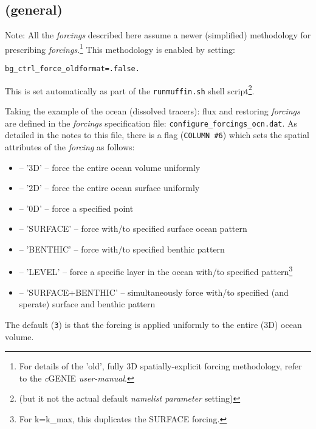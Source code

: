 \documentclass[11pt,fleqn]{book} %
\begin{document}
\subsection*{(general)}
\vspace{1mm}

Note: All the \textit{forcings} described here assume a newer (simplified) methodology for prescribing \textit{forcings}.\footnote{For details of the 'old', fully 3D spatially-explicit forcing methodology, refer to the \textit{c}GENIE \textit{user-manual}.
} This methodology is enabled by setting:
\vspace{-2pt}\small\begin{verbatim}
bg_ctrl_force_oldformat=.false.
\end{verbatim}\vspace{-2pt}\normalsize
This is set automatically as part of the \texttt{runmuffin.sh} shell script\footnote{(but it not the actual default \textit{namelist parameter} setting)}.

Taking the example of the ocean (dissolved tracers): flux and restoring \textit{forcings} are defined in the \textit{forcings} specification file: \texttt{configure\_forcings\_ocn.dat}. As detailed in the notes to this file, there is a flag (\texttt{COLUMN \#6}) which sets the spatial attributes of the \textit{forcing} as follows:
\vspace{1mm}
\begin{itemize}[noitemsep]
\item [3] -- '3D' -- force the entire ocean volume uniformly
\item [2] -- '2D' -- force the entire ocean surface uniformly
\item [0] -- '0D' -- force a specified point
\item [-1] -- 'SURFACE' -- force with/to specified surface ocean pattern
\item [-2] -- 'BENTHIC' -- force with/to specified benthic pattern
\item [-3] -- 'LEVEL' -- force a specific layer in the ocean with/to specified pattern\footnote{For k=k\_max, this duplicates the SURFACE forcing.}
\item [-4] -- 'SURFACE+BENTHIC' -- simultaneously force with/to specified (and sperate) surface and benthic pattern
\end{itemize}
\vspace{1mm}
The default (\texttt{3}) is that the forcing is applied uniformly to the entire (3D) ocean volume.
\end{document}
